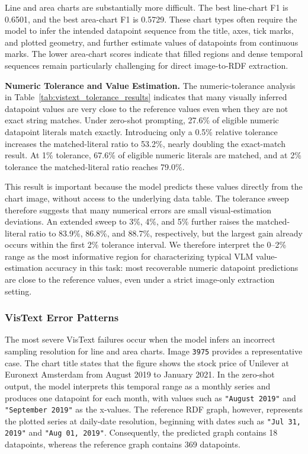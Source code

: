 \documentclass[preprint,12pt]{elsarticle}
\begin{document}
Line and area charts are substantially more difficult. The best line-chart F1 is 0.6501, and the best area-chart F1 is 0.5729. These chart types often require the model to infer the intended datapoint sequence from the title, axes, tick marks, and plotted geometry, and further estimate values of datapoints from continuous marks. The lower area-chart scores indicate that filled regions and dense temporal sequences remain particularly challenging for direct image-to-RDF extraction.

\textbf{Numeric Tolerance and Value Estimation.} The numeric-tolerance analysis in Table~\ref{tab:vistext_tolerance_results} indicates that many visually inferred datapoint values are very close to the reference values even when they are not exact string matches. Under zero-shot prompting, 27.6\% of eligible numeric datapoint literals match exactly. Introducing only a 0.5\% relative tolerance increases the matched-literal ratio to 53.2\%, nearly doubling the exact-match result. At 1\% tolerance, 67.6\% of eligible numeric literals are matched, and at 2\% tolerance the matched-literal ratio reaches 79.0\%.

This result is important because the model predicts these values directly from the chart image, without access to the underlying data table. The tolerance sweep therefore suggests that many numerical errors are small visual-estimation deviations. An extended sweep to 3\%, 4\%, and 5\% further raises the matched-literal ratio to 83.9\%, 86.8\%, and 88.7\%, respectively, but the largest gain already occurs within the first 2\% tolerance interval. We therefore interpret the 0--2\% range as the most informative region for characterizing typical VLM value-estimation accuracy in this task: most recoverable numeric datapoint predictions are close to the reference values, even under a strict image-only extraction setting.

\subsubsection{VisText Error Patterns}

The most severe VisText failures occur when the model infers an incorrect
sampling resolution for line and area charts. Image \texttt{3975} provides a
representative case. The chart title states that the figure shows the stock
price of Unilever at Euronext Amsterdam from August 2019 to January 2021. In
the zero-shot output, the model interprets this temporal range as a monthly
series and produces one datapoint for each month, with values such as
\texttt{"August 2019"} and \texttt{"September 2019"} as the x-values. The
reference RDF graph, however, represents the plotted series at daily-date
resolution, beginning with dates such as \texttt{"Jul 31, 2019"} and
\texttt{"Aug 01, 2019"}. Consequently, the predicted graph contains 18
datapoints, whereas the reference graph contains 369 datapoints.
\end{document}
